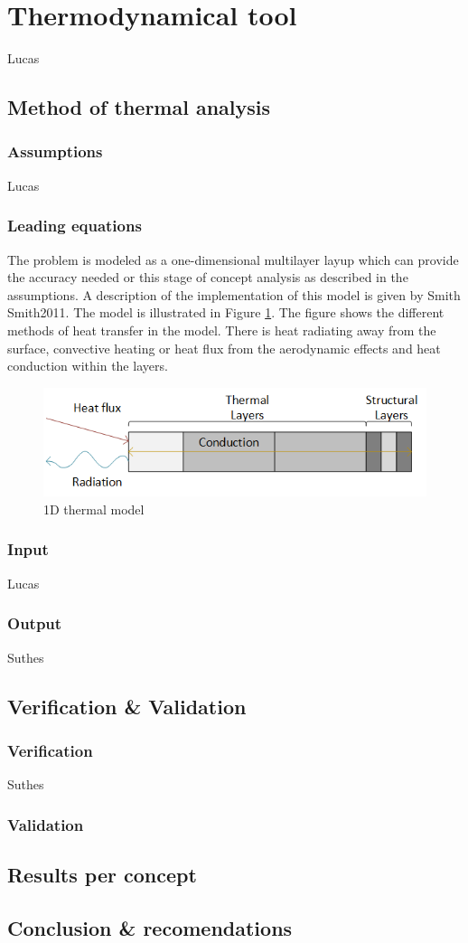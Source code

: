 \section{Thermodynamical tool}
\label{ch:thermtool}
Lucas

\subsection{Method of thermal analysis}

\subsubsection{Assumptions}
Lucas
\subsubsection{Leading equations}
The problem is modeled as a one-dimensional multilayer layup which can provide the accuracy needed or this stage of concept analysis as described in the assumptions. A description of the implementation of this model is given by Smith {Smith2011}. The model is illustrated in Figure \ref{fig:1dthermal}. The figure shows the different methods of heat transfer in the model. There is heat radiating away from the surface, convective heating or heat flux from the aerodynamic effects and heat conduction within the layers.

\begin{figure}[H]
	\centering
	\includegraphics[width = 1.0\textwidth]{Figure/1dthermal.png}
	\caption{1D thermal model}
	\label{fig:1dthermal}
\end{figure}
\subsubsection{Input}
Lucas
\subsubsection{Output}
Suthes


\subsection{Verification & Validation}

\subsubsection{Verification}
Suthes
\subsubsection{Validation}



\subsection{Results per concept}



\subsection{Conclusion & recomendations}
